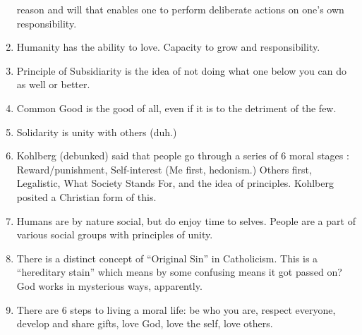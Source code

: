 \documentclass[10pt]{article}
\begin{document}
\begin{enumerate}
	reason and will that enables one to perform deliberate actions 
	on one's own responsibility.  
\item Humanity has the ability to love.  Capacity to grow and responsibility.
\item Principle of Subsidiarity is the idea of not doing what one 
	below you can do as well or better.
\item Common Good is the good of all, even if it is to the detriment 
	of the few.
\item Solidarity is unity with others (duh.)
\item Kohlberg (debunked) said that people go through a series of 6 
	moral stages : Reward/punishment, Self-interest (Me first, 
        hedonism.) Others first, Legalistic, What Society Stands For,
        and the idea of principles.  Kohlberg posited a Christian form
        of this.
\item Humans are by nature social, but do enjoy time to selves.  People are a
        part of various social groups with principles of unity.
\item There is a distinct concept of ``Original Sin'' in Catholicism.  This 
  is a ``hereditary stain'' which means by some confusing means it got passed
  on?  God works in mysterious ways, apparently.
\item There are 6 steps to living a moral life: be who you are, respect
  everyone, develop and share gifts, love God, love the self, love others.
\end{enumerate}
\end{document}

